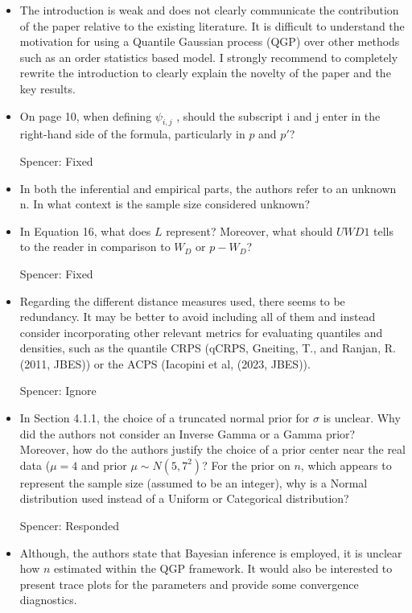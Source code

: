 \documentclass{article}
\newcommand{\spencer}[1]{{\color{blue} Spencer: #1}}
\begin{document}
\begin{itemize}
  \item The introduction is weak and does not clearly communicate the contribution of the paper relative
  to the existing literature. It is difficult to understand the motivation for using a Quantile Gaussian
  process (QGP) over other methods such as an order statistics based model. I strongly recommend
  to completely rewrite the introduction to clearly explain the novelty of the paper and the key
  results.
  
  \item On page 10, when defining $\psi_{i,j}$ , should the subscript i and j enter in the right-hand side of the
  formula, particularly in $p$ and $p'$?
  
  \spencer{Fixed}

  \item In both the inferential and empirical parts, the authors refer to an unknown n. In what context
  is the sample size considered unknown?

  \item In Equation 16, what does $L$ represent? Moreover, what should $UWD1$ tells to the reader in
  comparison to $W_D$ or $p -W_D$?
  
  \spencer{Fixed}

  \item Regarding the different distance measures used, there seems to be redundancy. It may be better to
  avoid including all of them and instead consider incorporating other relevant metrics for evaluating
  quantiles and densities, such as the quantile CRPS (qCRPS, Gneiting, T., and Ranjan, R. (2011,
  JBES)) or the ACPS (Iacopini et al, (2023, JBES)).
  
  \spencer{Ignore}

  \item In Section 4.1.1, the choice of a truncated normal prior for $\sigma$ is unclear. Why did the authors not
  consider an Inverse Gamma or a Gamma prior? Moreover, how do the authors justify the choice
  of a prior center near the real data ($\mu = 4$ and prior $\mu \sim N(5, 7^2)$? For the prior on $n$, which
  appears to represent the sample size (assumed to be an integer), why is a Normal distribution
  used instead of a Uniform or Categorical distribution?
  
  \spencer{Responded}

  \item Although, the authors state that Bayesian inference is employed, it is unclear how $n$ estimated
  within the QGP framework. It would also be interested to present trace plots for the parameters
  and provide some convergence diagnostics.
  

\end{itemize}
\end{document}
